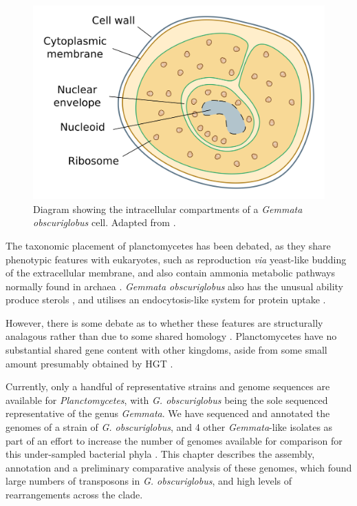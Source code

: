 \begin{figure}[H]
    \begin{minipage}{0.7\textwidth}
    \includegraphics[scale=0.7]{assembly/gemmata_cell.png}
    \end{minipage}
    \begin{minipage}{0.29\textwidth}
    \caption[Diagram showing the intracellular compartments of a \textit{Gemmata obscuriglobus} cell]{Diagram showing the intracellular compartments of a \textit{Gemmata obscuriglobus} cell. Adapted from \cite{Fuerst2011-le}.}
    \label{fig:gemmata_cell}
    \end{minipage}
\end{figure}

The taxonomic placement of planctomycetes has been debated, as they share phenotypic features with eukaryotes, such as reproduction \textit{via} yeast-like budding of the extracellular membrane, and also contain ammonia metabolic pathways normally found in archaea \citep{Fuchsman2006-zz,Fuerst2011-le}. \textit{Gemmata obscuriglobus} also has the unusual ability produce sterols \citep{Rivas-Marin2019-jd}, and utilises an endocytosis-like system for protein uptake \citep{Lonhienne2010-qa}.

However, there is some debate as to whether these features are structurally analagous rather than due to some shared homology \citep{McInerney2011-bx}. Planctomycetes have no substantial shared gene content with other kingdoms, aside from some small amount presumably obtained by HGT \citep{Fuchsman2006-zz}.

Currently, only a handful of representative strains and genome sequences are available for \textit{Planctomycetes}, with \textit{G. obscuriglobus} being the sole sequenced representative of the genus \textit{Gemmata}. We have sequenced and annotated the genomes of a strain of \textit{G. obscuriglobus}, and 4 other \textit{Gemmata}-like isolates as part of an effort to increase the number of genomes available for comparison for this under-sampled bacterial phyla \citep{Wu2009-zh}. 
This chapter describes the assembly, annotation and a preliminary comparative analysis of these genomes, which found large numbers of transposons in \textit{G. obscuriglobus}, and high levels of rearrangements across the clade.

